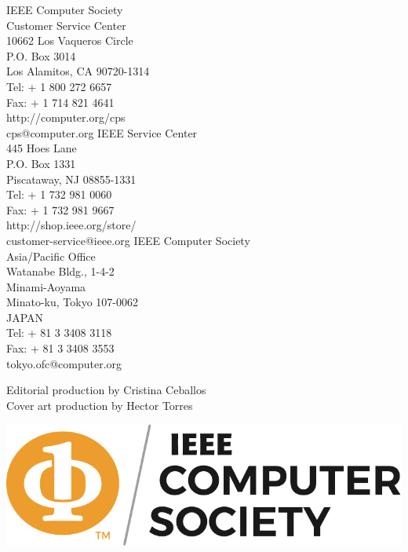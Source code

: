 \documentclass[12pt,a4,twosides]{book}
\begin{document}
\begin{center}
\begin{multicols}{3}
IEEE Computer Society\\
Customer Service Center\\
10662 Los Vaqueros Circle\\
P.O. Box 3014\\
Los Alamitos, CA 90720-1314\\
Tel: + 1 800 272 6657\\
Fax: + 1 714 821 4641\\
http://computer.org/cps\\
cps@computer.org
\columnbreak
IEEE Service Center\\
445 Hoes Lane\\
P.O. Box 1331\\
Piscataway, NJ 08855-1331\\
Tel: + 1 732 981 0060\\
Fax: + 1 732 981 9667\\
http://shop.ieee.org/store/\\
customer-service@ieee.org
\columnbreak
IEEE Computer Society\\
Asia/Pacific Office\\
Watanabe Bldg., 1-4-2\\
Minami-Aoyama\\
Minato-ku, Tokyo 107-0062\\
JAPAN\\
Tel: + 81 3 3408 3118\\
Fax: + 81 3 3408 3553\\
tokyo.ofc@computer.org
\end{multicols}
\end{center}

\begin{center}
Editorial production by Cristina Ceballos\\
Cover art production by Hector Torres
\end{center}

\begin{center}
\begin{multicols}{2}
\includegraphics[scale=0.4]{../images/ieee-cs-logo}
\columnbreak
\end{multicols}
\end{center}
\end{document}
